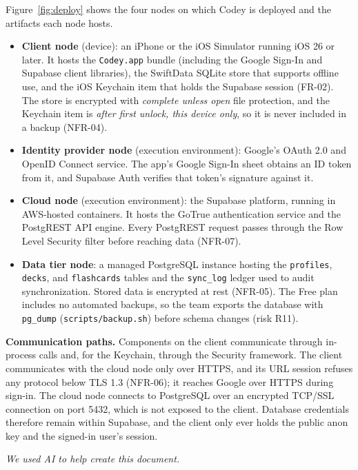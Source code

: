 \documentclass[12pt,letterpaper]{article}
\newcommand{\st}[1]{\guillemotleft#1\guillemotright}   %
\begin{document}
Figure~\ref{fig:deploy} shows the four nodes on which Codey is deployed and the
artifacts each node hosts.
\begin{itemize}
  \item \textbf{Client node} (\st{device}): an iPhone or the iOS Simulator running
        iOS 26 or later. It hosts the \texttt{Codey.app} bundle (including the Google
        Sign-In and Supabase client libraries), the SwiftData SQLite store that
        supports offline use, and the iOS Keychain item that holds the Supabase
        session (FR-02). The store is encrypted with \emph{complete unless open} file
        protection, and the Keychain item is \emph{after first unlock, this device
        only}, so it is never included in a backup (NFR-04).
  \item \textbf{Identity provider node} (\st{execution environment}): Google's OAuth
        2.0 and OpenID Connect service. The app's Google Sign-In sheet obtains an ID
        token from it, and Supabase Auth verifies that token's signature against it.
  \item \textbf{Cloud node} (\st{execution environment}): the Supabase platform,
        running in AWS-hosted containers. It hosts the GoTrue authentication service
        and the PostgREST API engine. Every PostgREST request passes through the Row
        Level Security filter before reaching data (NFR-07).
  \item \textbf{Data tier node}: a managed PostgreSQL instance hosting the
        \texttt{profiles}, \texttt{decks}, and \texttt{flashcards} tables and the
        \texttt{sync\_log} ledger used to audit synchronization. Stored data is
        encrypted at rest (NFR-05). The Free plan includes no automated backups, so
        the team exports the database with \texttt{pg\_dump}
        (\texttt{scripts/backup.sh}) before schema changes (risk R11).
\end{itemize}

\textbf{Communication paths.} Components on the client communicate through in-process
calls and, for the Keychain, through the Security framework. The client communicates
with the cloud node only over HTTPS, and its URL session refuses any protocol below
TLS 1.3 (NFR-06); it reaches Google over HTTPS during sign-in. The cloud node
connects to PostgreSQL over an encrypted TCP/SSL connection on port 5432, which is not
exposed to the client. Database credentials therefore remain within Supabase, and the
client only ever holds the public anon key and the signed-in user's session.

\vfill
\begin{center}
\small\itshape We used AI to help create this document.
\end{center}
\end{document}
